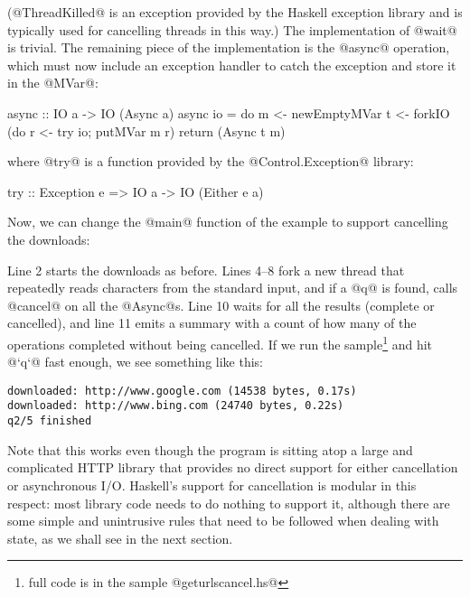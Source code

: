 \noindent (@ThreadKilled@ is an exception provided by the Haskell exception
library and is typically used for cancelling threads in this way.)
The implementation of @wait@ is trivial.
The remaining piece of the implementation is the @async@ operation,
which must now include an exception handler to catch the exception and
store it in the @MVar@:

\begin{haskell}
async :: IO a -> IO (Async a)
async io = do
   m <- newEmptyMVar
   t <- forkIO (do r <- try io; putMVar m r)
   return (Async t m)
\end{haskell}

\noindent where @try@ is a function provided by the
@Control.Exception@ library:

\begin{haskell}
try :: Exception e => IO a -> IO (Either e a)
\end{haskell}

Now, we can change the @main@ function of the example to support
cancelling the downloads:


\noindent Line 2 starts the downloads as before.  Lines 4--8 fork a
new thread that repeatedly reads characters from the standard input,
and if a @q@ is found, calls @cancel@ on all the @Async@s.  Line 10
waits for all the results (complete or cancelled), and line 11 emits a
summary with a count of how many of the operations completed without
being cancelled.  If we run the sample\footnote{full code is in the
  sample @geturlscancel.hs@} and hit @`q`@ fast enough, we see
something like this:

\begin{verbatim}
downloaded: http://www.google.com (14538 bytes, 0.17s)
downloaded: http://www.bing.com (24740 bytes, 0.22s)
q2/5 finished
\end{verbatim}

Note that this works even though the program is sitting atop a large
and complicated HTTP library that provides no direct support for
either cancellation or asynchronous I/O.  Haskell's support for
cancellation is modular in this respect: most library code needs to do
nothing to support it, although there are some simple and unintrusive
rules that need to be followed when dealing with state, as we shall
see in the next section.

